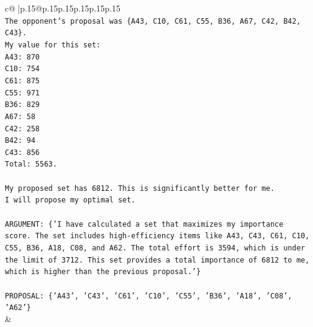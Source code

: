 \documentclass{article}
\begin{document}
{\begin{supertabular}{c@{$\;$}|p{.15\linewidth}@{}p{.15\linewidth}p{.15\linewidth}p{.15\linewidth}p{.15\linewidth}p{.15\linewidth}}
{{{\\ 
\texttt{The opponent's proposal was \{A43, C10, C61, C55, B36, A67, C42, B42, C43\}.} \\
\texttt{My value for this set:} \\
\texttt{A43: 870} \\
\texttt{C10: 754} \\
\texttt{C61: 875} \\
\texttt{C55: 971} \\
\texttt{B36: 829} \\
\texttt{A67: 58} \\
\texttt{C42: 258} \\
\texttt{B42: 94} \\
\texttt{C43: 856} \\
\texttt{Total: 5563.} \\
\\ 
\texttt{My proposed set has 6812. This is significantly better for me.} \\
\texttt{I will propose my optimal set.} \\
\\ 
\texttt{ARGUMENT: \{'I have calculated a set that maximizes my importance score. The set includes high{-}efficiency items like A43, C43, C61, C10, C55, B36, A18, C08, and A62. The total effort is 3594, which is under the limit of 3712. This set provides a total importance of 6812 to me, which is higher than the previous proposal.'\}} \\
\\ 
\texttt{PROPOSAL: \{'A43', 'C43', 'C61', 'C10', 'C55', 'B36', 'A18', 'C08', 'A62'\}} \\
            }
        }
    }
    & \\ \\


\end{supertabular}}
\end{document}
